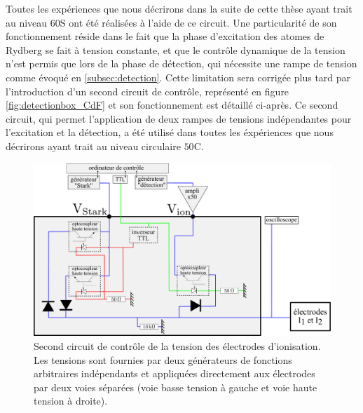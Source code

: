 Toutes les expériences que nous décrirons dans la suite de cette thèse ayant trait au niveau $\mathrm{60S}$ ont été réalisées à l'aide de ce circuit.
Une particularité de son fonctionnement réside dans le fait que la phase d'excitation des atomes de Rydberg se fait à tension constante, et que le contrôle dynamique de la tension n'est permis que lors de la phase de détection, qui nécessite une rampe de tension comme évoqué en \ref{subsec:detection}.
Cette limitation sera corrigée plus tard par l'introduction d'un second circuit de contrôle, représenté en figure \eqref{fig:detectionbox_CdF} et son fonctionnement est détaillé ci-après.
Ce second circuit, qui permet l'application de deux rampes de tensions indépendantes pour l'excitation et la détection, a été utilisé dans toutes les éxpériences que nous décrirons ayant trait au niveau circulaire $\mathrm{50C}$.
%
\begin{figure}[h]
\centering
\includegraphics[width=\linewidth]{figures/detectionbox_CdF}
\caption[Second circuit de contrôle de la tension des électrodes d'ionisation]{
Second circuit de contrôle de la tension des électrodes d'ionisation.
Les tensions sont fournies par deux générateurs de fonctions arbitraires indépendants et appliquées directement aux électrodes par deux voies séparées (voie basse tension à gauche et voie haute tension à droite).
}
\label{fig:detectionbox_CdF}
\end{figure}

